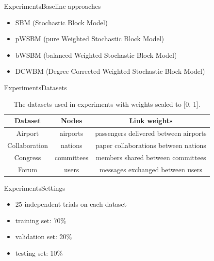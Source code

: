\documentclass{beamer}
\begin{document}
\begin{frame}{Experiments}{Baseline approaches}
	\begin{itemize}
		\item SBM (Stochastic Block Model)
		\item pWSBM (pure Weighted Stochastic Block Model)
		\item bWSBM (balanced Weighted Stochastic Block Model)
		\item DCWBM (Degree Corrected Weighted Stochastic Block Model)
	\end{itemize}
\end{frame}

\begin{frame}{Experiments}{Datasets}
	\begin{table}[H]\centering
		\caption{The datasets used in experiments with weights scaled to [0, 1].}
		\begin{tabular}{|c|c|c|}  \hline
			\textbf{Dataset} & \textbf{Nodes} & \textbf{Link weights} \\ \hline
			Airport & airports & passengers delivered between airports \\ \hline
			Collaboration & nations & paper collaborations between nations \\ \hline
			Congress & committees  & members shared between committees \\ \hline
			Forum  & users & messages exchanged between users \\ \hline
		\end{tabular}
		\label{tab:datasets}
	\end{table}
\end{frame}

\begin{frame}{Experiments}{Settings}
	\begin{itemize}
		\item 25 independent trials on each dataset
		\item training set: 70\%
		\item validation set: 20\%
		\item testing set: 10\%
	\end{itemize}
\end{frame}
\end{document}
